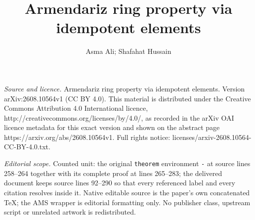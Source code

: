 \documentclass[10pt,a4paper]{amsart}
\numberwithin{equation}{section}
\begin{document}
\title[Armendariz ring property via idempotent elements]{Armendariz ring property via idempotent elements}
\author{Asma Ali; Shafahat Hussain}
\date{}
\maketitle
\noindent\emph{Source and licence.} Armendariz ring property via idempotent elements. Version arXiv:2608.10564v1 (CC BY 4.0). This material is distributed under the Creative Commons Attribution 4.0 International licence, http://creativecommons.org/licenses/by/4.0/, as recorded in the arXiv OAI licence metadata for this exact version and shown on the abstract page https://arxiv.org/abs/2608.10564v1. Full rights notice: licenses/arxiv-2608.10564-CC-BY-4.0.txt.\par\smallskip
\noindent\textit{Editorial scope.} Counted unit: the original \texttt{theorem} environment \texttt{-} at source lines 258--264 together with its complete proof at lines 265--283; the delivered document keeps source lines 92--290 so that every referenced label and every citation resolves inside it. Native editable source is the paper's own concatenated TeX; the AMS wrapper is editorial formatting only. No publisher class, upstream script or unrelated artwork is redistributed.
\end{document}
